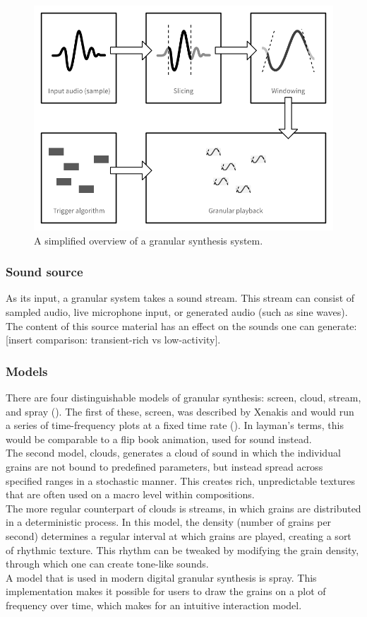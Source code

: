 \documentclass[10pt, twocolumn]{IEEEtran}
\begin{document}
\begin{figure}[ht!]
	\includegraphics[width=\linewidth]{GranularDiagram.png}
	\caption{A simplified overview of a granular synthesis system.}
	\label{fig:block_diagram}
\end{figure}

\subsubsection{Sound source}
As its input, a granular system takes a sound stream. This stream can consist of sampled audio, live microphone input, or generated audio (such as sine waves). The content of this source material has an effect on the sounds one can generate: [insert comparison: transient-rich vs low-activity].

\subsubsection{Models}
There are four distinguishable models of granular synthesis: screen, cloud, stream, and spray (\cite{roads12}). The first of these, screen, was described by Xenakis and would run a series of time-frequency plots at a fixed time rate (\cite{xenakis63}). In layman's terms, this would be comparable to a flip book animation, used for sound instead. \\
The second model, clouds, generates a cloud of sound in which the individual grains are not bound to predefined parameters, but instead spread across specified ranges in a stochastic manner. This creates rich, unpredictable textures that are often used on a macro level within compositions. \\
The more regular counterpart of clouds is streams, in which grains are distributed in a deterministic process. In this model, the density (number of grains per second) determines a regular interval at which grains are played, creating a sort of rhythmic texture. This rhythm can be tweaked by modifying the grain density, through which one can create tone-like sounds. \\
A model that is used in modern digital granular synthesis is spray. This implementation makes it possible for users to draw the grains on a plot of frequency over time, which makes for an intuitive interaction model.
\end{document}
